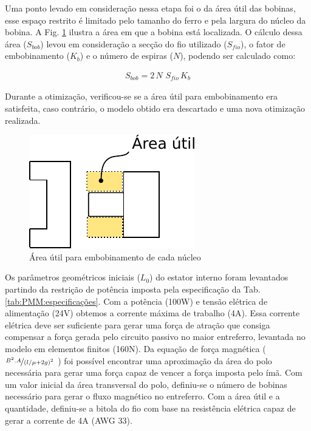 Uma ponto levado em consideração nessa etapa foi o da área útil das bobinas, esse espaço restrito é limitado pelo tamanho do ferro e pela largura do núcleo da bobina. A Fig. \ref{fig:modelo_ativo_bobina} ilustra a área em que a bobina está localizada. O cálculo dessa área ($S_{bob}$) levou em consideração a secção do fio utilizado ($S_{fio}$), o fator de embobinamento ($K_b$) e o número de espiras ($N$), podendo ser calculado como: 

\begin{align}
	S_{bob} = 2 \, N \, \, S_{fio} \, K_b
\end{align}

Durante a otimização, verificou-se se a área útil para embobinamento era satisfeita, caso contrário, o modelo obtido era descartado e uma nova otimização realizada.

\begin{figure}[ht!]
\centering
\includegraphics[width=0.7\linewidth]{Figs/modelo_ativo_bobina}
\caption{Área útil para embobinamento de cada núcleo}
\label{fig:modelo_ativo_bobina}
\end{figure}

Os parâmetros geométricos iniciais ($L_0$) do estator interno foram levantados partindo da restrição de potência imposta pela especificação da Tab. \ref{tab:PMM:especificações}. Com a potência (100W) e tensão elétrica de alimentação (24V) obtemos a corrente máxima de trabalho (4A). Essa corrente elétrica deve ser suficiente para gerar uma força de atração que consiga compensar a força gerada pelo circuito passivo no maior entreferro, levantada no modelo em elementos finitos (160N). Da equação de força magnética ($\nicefrac{B^2.A}{(l/\mu +2g)^2}$ ) foi possível encontrar uma aproximação da área do polo necessária para gerar uma força capaz de vencer a força imposta pelo ímã. Com um valor inicial da área transversal do polo, definiu-se o número de  bobinas necessário para gerar o fluxo magnético no entreferro. Com a área útil e a quantidade, definiu-se a bitola do fio com base na resistência elétrica capaz de gerar a corrente de 4A (AWG 33).

